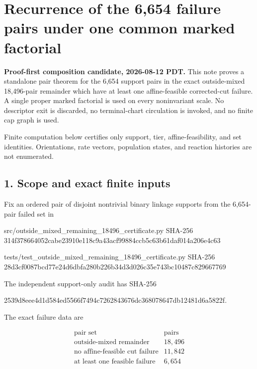 \section{Recurrence of the 6,654 failure pairs under one common marked
factorial}

\textbf{Proof-first composition candidate, 2026-08-12 PDT.} This note
proves a standalone pair theorem for the 6,654 support pairs in the
exact outside-mixed 18,496-pair remainder which have at least one
affine-feasible corrected-cut failure. A single proper marked factorial
is used on every noninvariant scale. No descriptor exit is discarded, no
terminal-chart circulation is invoked, and no finite cap graph is used.

Finite computation below certifies only support, tier,
affine-feasibility, and set identities. Orientations, rate vectors,
population states, and reaction histories are not enumerated.

\subsection{1. Scope and exact finite
inputs}

Fix an ordered pair of disjoint nontrivial binary linkage supports from
the 6,654-pair failed set in

\begin{CodeBlock}
src/outside_mixed_remaining_18496_certificate.py
SHA-256 314f378664052cabe23910e118c9a43acf99884ccb5c63b61daf014a206e4c63

tests/test_outside_mixed_remaining_18496_certificate.py
SHA-256 28d3cf0087bcd77e24d6dbfa280b226b34d3d026c35e743bc10487c829667769
\end{CodeBlock}

The independent support-only audit has SHA-256

\begin{CodeBlock}
2539d8eee4d1d584ed5566f7494c7262843676dc368078647db12481d6a5822f.
\end{CodeBlock}

The exact failure data are

\[
\begin{array}{c|r}
\text{pair set}&\text{pairs}\ \\ \hline
\text{outside-mixed remainder}&18{,}496\\
\text{no affine-feasible cut failure}&11{,}842\\
\text{at least one feasible failure}&6{,}654
\end{array}                                                     \tag{1.1}
\]

